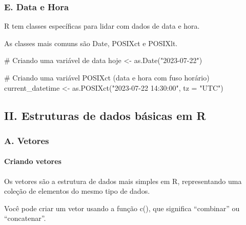 \documentclass[
  letterpaper,
  DIV=11,
  numbers=noendperiod]{scrartcl}
\let\oldparagraph\paragraph
\renewcommand{\paragraph}[1]{\oldparagraph{#1}\mbox{}}
\newenvironment{Shaded}{\begin{snugshade}}{\end{snugshade}}
\newcommand{\AttributeTok}[1]{\textcolor[rgb]{0.40,0.45,0.13}{#1}}
\newcommand{\CommentTok}[1]{\textcolor[rgb]{0.37,0.37,0.37}{#1}}
\newcommand{\FunctionTok}[1]{\textcolor[rgb]{0.28,0.35,0.67}{#1}}
\newcommand{\NormalTok}[1]{\textcolor[rgb]{0.00,0.23,0.31}{#1}}
\newcommand{\OtherTok}[1]{\textcolor[rgb]{0.00,0.23,0.31}{#1}}
\newcommand{\StringTok}[1]{\textcolor[rgb]{0.13,0.47,0.30}{#1}}
\begin{document}
\hypertarget{e.-data-e-hora}{%
\subsubsection{E. Data e Hora}\label{e.-data-e-hora}}

R tem classes específicas para lidar com dados de data e hora.

As classes mais comuns são Date, POSIXct e POSIXlt.

\begin{Shaded}
\begin{Highlighting}[]
\CommentTok{\# Criando uma variável de data}
\NormalTok{hoje }\OtherTok{\textless{}{-}} \FunctionTok{as.Date}\NormalTok{(}\StringTok{"2023{-}07{-}22"}\NormalTok{)}

\CommentTok{\# Criando uma variável POSIXct (data e hora com fuso horário)}
\NormalTok{current\_datetime }\OtherTok{\textless{}{-}} \FunctionTok{as.POSIXct}\NormalTok{(}\StringTok{"2023{-}07{-}22 14:30:00"}\NormalTok{, }\AttributeTok{tz =} \StringTok{"UTC"}\NormalTok{)}
\end{Highlighting}
\end{Shaded}

\hypertarget{ii.-estruturas-de-dados-buxe1sicas-em-r}{%
\subsection{II. Estruturas de dados básicas em
R}\label{ii.-estruturas-de-dados-buxe1sicas-em-r}}

\hypertarget{a.-vetores}{%
\subsubsection{A. Vetores}\label{a.-vetores}}

\hypertarget{criando-vetores}{%
\paragraph{Criando vetores}\label{criando-vetores}}

Os vetores são a estrutura de dados mais simples em R, representando uma
coleção de elementos do mesmo tipo de dados.

Você pode criar um vetor usando a função c(), que significa ``combinar''
ou ``concatenar''.
\end{document}
